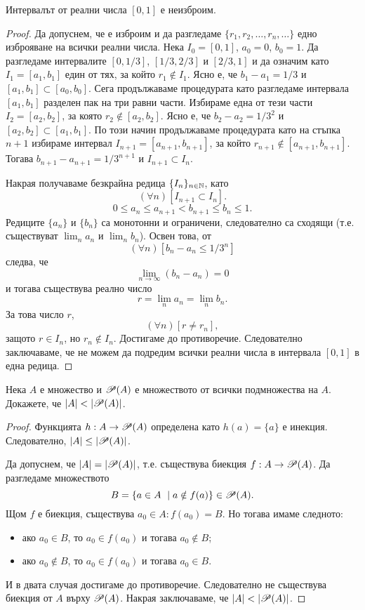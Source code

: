 \begin{thm}[Кантор]
  Интервалът от реални числа $[0,1]$ е неизброим.
\end{thm}
\begin{proof}
  Да допуснем, че е изброим и да разгледаме $\{r_1,r_2,\dots,r_n,\dots\}$
  едно изброяване на всички реални числа.
  Нека $I_0 = [0, 1]$, $a_0 = 0$, $b_0 = 1$.
  Да разгледаме интервалите $[0,1/3]$, $[1/3,2/3]$ и $[2/3,1]$ 
  и да означим като $I_1 = [a_1,b_1]$ един от тях, за който $r_1 \not\in I_1$.
  Ясно е, че $b_1-a_1 = 1/3$ и $[a_1,b_1] \subset [a_0,b_0]$.
  Сега продължаваме процедурата като разгледаме интервала $[a_1,b_1]$ разделен пак на три равни части.
  Избираме една от тези части $I_2 = [a_2,b_2]$, за която $r_2 \not\in [a_2,b_2]$.
  Ясно е, че $b_2-a_2 = 1/3^2$ и $[a_2,b_2] \subset [a_1,b_1]$.
  По този начин продължаваме процедурата като на стъпка $n+1$ 
  избираме интервал $I_{n+1} = [a_{n+1},b_{n+1}]$, за който $r_{n+1} \not\in [a_{n+1},b_{n+1}]$.
  Тогава $b_{n+1}-a_{n+1} = 1/3^{n+1}$ и $I_{n+1} \subset I_n$.

  Накрая получаваме безкрайна редица $\{I_n\}_{n\in\mathbb{N}}$, като
  \[(\forall n)[I_{n+1}\subset I_n].\]
  \[0\leq a_n \leq a_{n+1} < b_{n+1} \leq b_n \leq 1.\]
  Редиците $\{a_n\}$ и $\{b_n\}$ са монотонни и ограничени, следователно са сходящи 
  (т.е. съществуват $\lim_n a_n$ и $\lim_n b_n$).
  Освен това, от \[(\forall n)[b_n-a_n \leq 1/3^n]\] следва, че 
  \[\lim_{n\to\infty}(b_n-a_n) = 0\] и тогава съществува реално число 
  \[r = \lim_n a_n = \lim_n b_n.\]
  За това число $r$,
  \[(\forall n)[r \neq r_n],\]
  защото $r \in I_n$, но $r_n \not\in I_n$.
  Достигаме до противоречие.
  Следователно заключаваме, че не можем да подредим всички реални числа в интервала $[0,1]$
  в една редица.
\end{proof}


\begin{thm}
  Нека $A$ е множество и $\mathscr{P}(A)$ е множеството от всички подмножества на $A$.
  Докажете, че $|A| < |\mathscr{P}(A)|$.
\end{thm}
\begin{proof}
  Функцията $h:A \to \mathscr{P}(A)$ определена като $h(a) = \{a\}$ е инекция.
  Следователно, $\lvert{A}\rvert \leq \lvert{\mathscr{P}(A)}\rvert$.

  Да допуснем, че $\lvert{A}\rvert = \lvert{\mathscr{P}(A)}\rvert$, т.е. 
  съществува биекция $f:A\rightarrow \mathscr{P}(A)$.
  Да разгледаме множеството \[B=\{a\in A\ \mid a\notin f(a)\}\in\mathscr{P}(A).\]
  Щом $f$ е биекция, съществува $a_0\in A: f(a_0) = B$.
  Но тогава имаме следното:
  \begin{itemize}
  \item
    ако $a_0\in B$, то $a_0 \in f(a_0)$ и тогава $a_0\not\in B$;
  \item
    ако $a_0\not\in B$, то $a_0 \in f(a_0)$ и тогава $a_0\in B$.
  \end{itemize}
  И в двата случая достигаме до противоречие.
  Следователно не съществува биекция от $A$ върху $\mathscr{P}(A)$.
  Накрая заключаваме, че $\lvert{A}\rvert < \lvert{\mathscr{P}(A)}\rvert$.
\end{proof}

